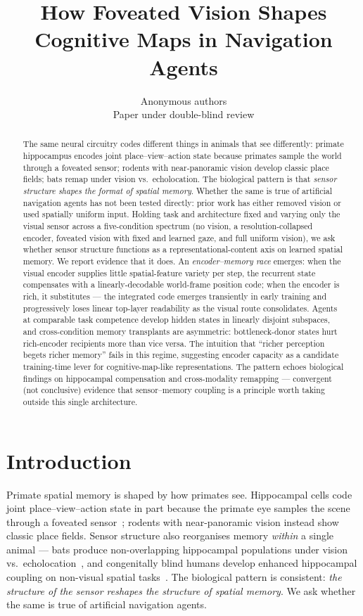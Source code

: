 \documentclass{article}
\title{How Foveated Vision Shapes Cognitive Maps in Navigation Agents}
\author{%
  Anonymous authors\\
  Paper under double-blind review\\
}
\begin{document}
\maketitle

\begin{abstract}
The same neural circuitry codes different things in animals that see differently: primate hippocampus encodes joint place--view--action state because primates sample the world through a foveated sensor; rodents with near-panoramic vision develop classic place fields; bats remap under vision vs.\ echolocation. The biological pattern is that \emph{sensor structure shapes the format of spatial memory}. Whether the same is true of artificial navigation agents has not been tested directly: prior work has either removed vision or used spatially uniform input. Holding task and architecture fixed and varying only the visual sensor across a five-condition spectrum (no vision, a resolution-collapsed encoder, foveated vision with fixed and learned gaze, and full uniform vision), we ask whether sensor structure functions as a representational-content axis on learned spatial memory. We report evidence that it does. An \emph{encoder--memory race} emerges: when the visual encoder supplies little spatial-feature variety per step, the recurrent state compensates with a linearly-decodable world-frame position code; when the encoder is rich, it substitutes --- the integrated code emerges transiently in early training and progressively loses linear top-layer readability as the visual route consolidates. Agents at comparable task competence develop hidden states in linearly disjoint subspaces, and cross-condition memory transplants are asymmetric: bottleneck-donor states hurt rich-encoder recipients more than vice versa. The intuition that ``richer perception begets richer memory'' fails in this regime, suggesting encoder capacity as a candidate training-time lever for cognitive-map-like representations. The pattern echoes biological findings on hippocampal compensation and cross-modality remapping --- convergent (not conclusive) evidence that sensor--memory coupling is a principle worth taking outside this single architecture.
\end{abstract}


\section{Introduction}

Primate spatial memory is shaped by how primates see. Hippocampal cells code joint place--view--action state in part because the primate eye samples the scene through a foveated sensor~\citep{wirth2017gaze,rolls2024why}; rodents with near-panoramic vision instead show classic place fields. Sensor structure also reorganises memory \emph{within} a single animal --- bats produce non-overlapping hippocampal populations under vision vs.\ echolocation~\citep{geva2016remapping}, and congenitally blind humans develop enhanced hippocampal coupling on non-visual spatial tasks~\citep{kupers2014blind}. The biological pattern is consistent: \emph{the structure of the sensor reshapes the structure of spatial memory}. We ask whether the same is true of artificial navigation agents.
\end{document}
